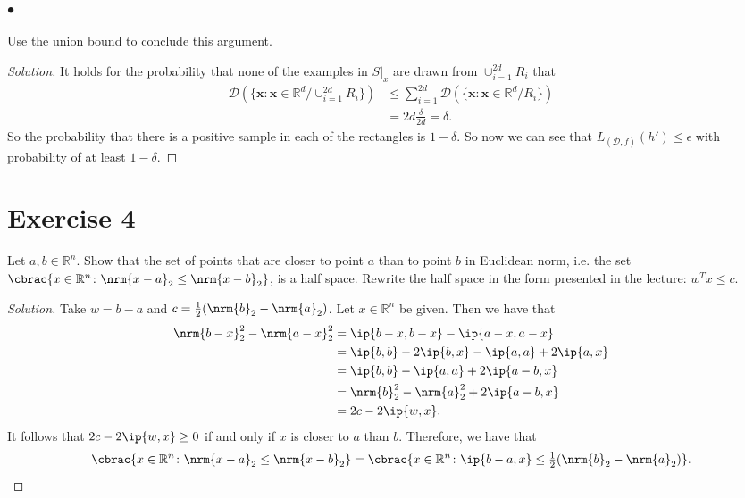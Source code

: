 \documentclass[10pt, a4paper, twoside]{amsart}
\newcommand{\R}{\ensuremath{\mathbb{R}}}
\DeclarePairedDelimiter\cbrac\{\}
\DeclarePairedDelimiter{\ip}\langle\rangle
\DeclarePairedDelimiter{\nrm}\lVert\rVert
\renewcommand{\c}{\ensuremath{\colon}}
\newenvironment{solution}
               {\let\oldqedsymbol=\qedsymbol
                \renewcommand{\qedsymbol}{$\blacktriangleleft$}
                \begin{proof}[Solution]}
               {\end{proof}
                \renewcommand{\qedsymbol}{\oldqedsymbol}}
\begin{document}
\subsubsection*{$\bullet$}
Use the union bound to conclude this argument. \\
\begin{solution}
  It holds for the probability that none of the examples in $S|_x$ are drawn from $\cup_{i=1}^{2d} R_i$  that
\begin{align*}
  \mathcal{D}(\{\mathbf{x}:\mathbf{x}\in \R^d/\cup_{i=1}^{2d} R_i\}) & \leq \sum_{i=1}^{2d} \mathcal{D}(\{\mathbf{x}:\mathbf{x}\in \R^d/R_i\}) \\
                                                                                 & = 2d\frac{\delta}{2d} = \delta.
\end{align*}
So the probability that there is a positive sample in each of the rectangles is $1-\delta$. So now we can see that $L_{(\mathcal{D},f)}(h')\leq \epsilon$ with probability of at least $1 - \delta$.
\end{solution}

\section*{Exercise 4}
Let $a, b \in \R^n$. 
Show that the set of points that are closer to point $a$ than to point $b$ in Euclidean norm, 
i.e. the set $\cbrac{x \in \R^n \c \nrm{x-a}_2 \leq \nrm{x-b}_2}$, is a half space. 
Rewrite the half space in the form presented in the lecture: $w^T x \leq c$.

\begin{solution}
 Take $w=b-a$ and $c=\tfrac{1}{2}(\nrm{b}_2-\nrm{a}_2)$. Let $x \in \R^n$ be given.
 Then we have that 
 \begin{align*}
 \nrm{b-x}_2^2 -\nrm{a-x}_2^2 &= \ip{b-x, b-x}-\ip{a-x, a-x} \\
 &= \ip{b,b}-2\ip{b,x}-\ip{a,a} + 2\ip{a,x} \\
 &= \ip{b,b}-\ip{a,a} + 2\ip{a-b,x} \\
 &= \nrm{b}_2^2-\nrm{a}_2^2 + 2\ip{a-b,x} \\
 &= 2c - 2\ip{w,x}.
 \end{align*}
 It follows that $2c - 2\ip{w,x} \geq 0$ if and only if $x$ is closer to $a$ than $b$.
 Therefore, we have that 
 \begin{equation*}
  \cbrac{x \in \R^n \c \nrm{x-a}_2 \leq \nrm{x-b}_2}=\cbrac{x \in \R^n \c \ip{b-a,x} \leq \tfrac{1}{2}(\nrm{b}_2-\nrm{a}_2)}.
\end{equation*}
\end{solution}
\end{document}
